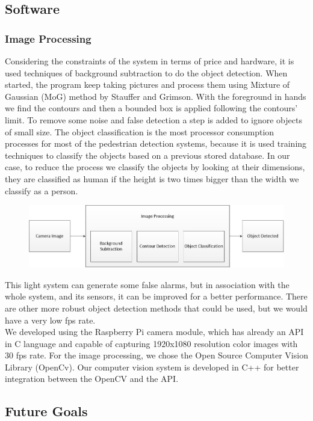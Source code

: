 \documentclass[journal,transmag]{IEEEtran}
\begin{document}
\subsection{Software}
\subsubsection{Image Processing}
\- Considering the constraints of the system in terms of price and hardware, it is used techniques of background subtraction to do the object detection. When started, the program keep taking pictures and process them using Mixture of Gaussian (MoG) method by Stauffer and Grimson. With the foreground in hands we find the contours and then a bounded box is applied following the contours' limit. To remove some noise and false detection a step is added to ignore objects of small size. The object classification is the most processor consumption  processes for most of the pedestrian detection systems, because it is used training techniques to classify the objects based on a previous stored database. In our case, to reduce the process we classify the objects by looking at their dimensions, they are classified as human if the height is two times bigger than the width we classify as a person. \\
\begin{figure}[h!]
\centering
\includegraphics[scale=0.3]{imageprocessing.jpg}
\end{figure}	
\- This light system can generate some false alarms, but in association with the whole system, and its sensors, it can be improved for a better performance. There are other more robust object detection methods that could be used, but we would have a very low fps rate. \\
\- We developed using the Raspberry Pi camera module, which has already an API in C language and capable of capturing 1920x1080 resolution color images with 30 fps rate. For the image processing, we chose the Open Source Computer Vision Library (OpenCv). Our computer vision system is developed in C++ for better integration between the OpenCV and the API.\\

\subsection{Future Goals}
\end{document}
